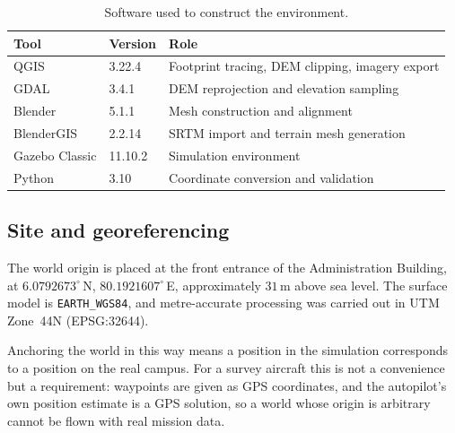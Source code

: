 \begin{table}[htbp]
\centering
\caption{Software used to construct the environment.}
\label{tab:world-tools}
\begin{tabular}{@{}lll@{}}
\toprule
Tool & Version & Role \\
\midrule
QGIS            & 3.22.4   & Footprint tracing, DEM clipping, imagery export \\
GDAL            & 3.4.1    & DEM reprojection and elevation sampling \\
Blender         & 5.1.1    & Mesh construction and alignment \\
BlenderGIS      & 2.2.14   & SRTM import and terrain mesh generation \\
Gazebo Classic  & 11.10.2  & Simulation environment \\
Python          & 3.10     & Coordinate conversion and validation \\
\bottomrule
\end{tabular}
\end{table}

\subsection{Site and georeferencing}
\label{sec:world-site}

The world origin is placed at the front entrance of the Administration
Building, at $6.0792673^{\circ}$\,N, $80.1921607^{\circ}$\,E, approximately
$31$\,m above sea level. The surface model is \texttt{EARTH\_WGS84}, and
metre-accurate processing was carried out in UTM Zone~44N (EPSG:32644).

Anchoring the world in this way means a position in the simulation
corresponds to a position on the real campus. For a survey aircraft this is
not a convenience but a requirement: waypoints are given as GPS coordinates,
and the autopilot's own position estimate is a GPS solution, so a world whose
origin is arbitrary cannot be flown with real mission data.

